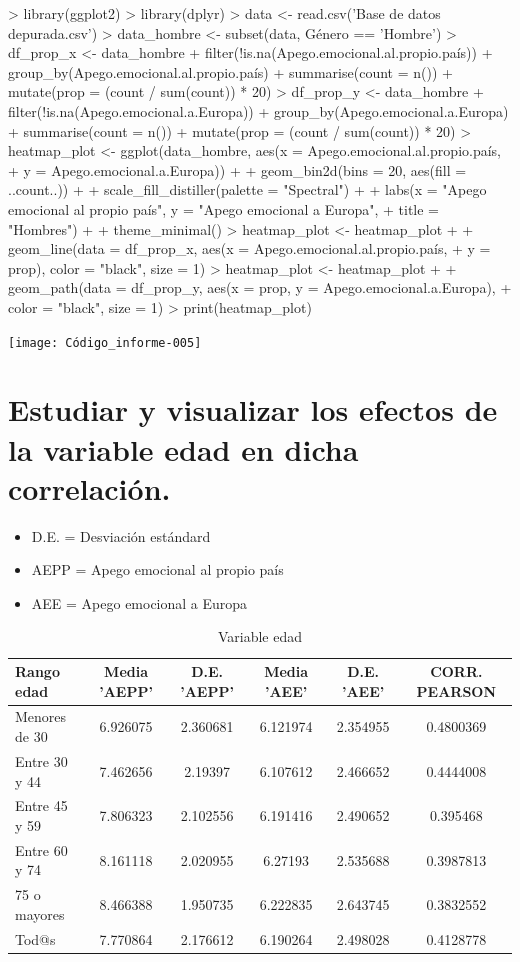 \documentclass{article}
\begin{document}
\begin{Schunk}
\begin{Sinput}
> library(ggplot2)
> library(dplyr)
> data <- read.csv('Base de datos depurada.csv')
> data_hombre <- subset(data, Género == 'Hombre')
> df_prop_x <- data_hombre %
+   filter(!is.na(Apego.emocional.al.propio.país)) %
+   group_by(Apego.emocional.al.propio.país) %
+   summarise(count = n()) %
+   mutate(prop = (count / sum(count)) * 20)
> df_prop_y <- data_hombre %
+   filter(!is.na(Apego.emocional.a.Europa)) %
+   group_by(Apego.emocional.a.Europa) %
+   summarise(count = n()) %
+   mutate(prop = (count / sum(count)) * 20)
> heatmap_plot <- ggplot(data_hombre, aes(x = Apego.emocional.al.propio.país,
+                                  y = Apego.emocional.a.Europa)) +
+   geom_bin2d(bins = 20, aes(fill = ..count..)) +
+   scale_fill_distiller(palette = "Spectral") +
+   labs(x = "Apego emocional al propio país", y = "Apego emocional a Europa",
+        title = "Hombres") +
+   theme_minimal()
> heatmap_plot <- heatmap_plot +
+   geom_line(data = df_prop_x, aes(x = Apego.emocional.al.propio.país,
+                                   y = prop), color = "black", size = 1)
> heatmap_plot <- heatmap_plot +
+   geom_path(data = df_prop_y, aes(x = prop, y = Apego.emocional.a.Europa),
+             color = "black", size = 1)
> print(heatmap_plot)
\end{Sinput}
\end{Schunk}
\texttt{[image: Código\_informe-005]}

\section{Estudiar y visualizar los efectos de la variable edad en dicha correlación.}
 \begin{itemize}
 \item D.E. = Desviación estándard
 \item AEPP = Apego emocional al propio país
 \item AEE = Apego emocional a Europa
 \end{itemize}
 \begin{table}[h!]
 \caption{Variable edad}
 \begin{tabular}{l | c c c c c}
 \hline
 \bf{Rango edad} & \bf{Media 'AEPP'} & \bf{D.E. 'AEPP'} & \bf{Media 'AEE'} & \bf{D.E. 'AEE'} & \bf{CORR. PEARSON} \\
 \hline
 Menores de 30 & 6.926075 & 2.360681 & 6.121974 & 2.354955 & 0.4800369 \\
 Entre 30 y 44 & 7.462656 & 2.19397 & 6.107612 & 2.466652 & 0.4444008 \\
 Entre 45 y 59 & 7.806323 & 2.102556 & 6.191416 & 2.490652 & 0.395468 \\
 Entre 60 y 74 & 8.161118 & 2.020955 & 6.27193 & 2.535688 & 0.3987813 \\
 75 o mayores & 8.466388 & 1.950735 & 6.222835 & 2.643745 & 0.3832552 \\
 Tod@s & 7.770864 & 2.176612 & 6.190264 & 2.498028 & 0.4128778 \\
 \hline
 \end{tabular}
 \end{table}
 
\end{document}
